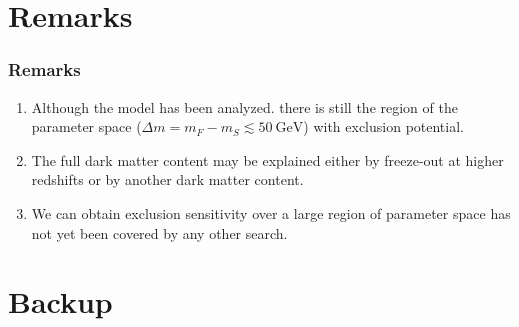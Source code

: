 \documentclass{beamer}
\begin{document}
\section{Remarks}
\begin{frame}
\frametitle{Remarks}

\begin{exampleblock}{}

\begin{enumerate}

\item Although the model has been analyzed. there is still the region of the parameter space ($\Delta m=m_{F}-m_S\lesssim 50\ \text{GeV}$) with exclusion potential.
\item The full dark matter content may be explained either by freeze-out at higher redshifts or by another dark matter content.
\item  We can obtain exclusion sensitivity over a large region of parameter space has not yet been covered by any other search.
\end{enumerate}

\end{exampleblock}

\end{frame}




\ThankYouFrame


\section{Backup}

\end{document}
